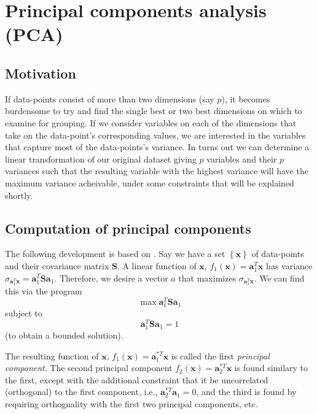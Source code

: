 \chapter{Principal components analysis (PCA)\label{chap:pca}}

\section{Motivation}

If data-points consist of more than two dimensions (say $p$), it becomes
burdensome to try and find the single best or two best dimensions on which to
examine for grouping. If we consider variables on each of the dimensions that
take on the data-point's corresponding values, we are interested in the
variables that capture most of the data-points's variance. In turns out we can
determine a linear transformation of our original dataset giving $p$ variables
and their $p$ variances such that the resulting variable with the highest
variance will have the maximum variance acheivable, under some constraints that
will be explained shortly. 

\section{Computation of principal components}

The following development is based on \cite{jolliffe2002principal}. Say we have
a set $\left\{ \boldsymbol{x} \right\}$ of data-points and their covariance
matrix $\boldsymbol{S}$. A linear function of $\boldsymbol{x}$,
$f_1(\boldsymbol{x})=\boldsymbol{a}_{1}^{T}\boldsymbol{x}$ has variance
$\sigma_{\boldsymbol{a}_{1}^{T}\boldsymbol{x}}=\boldsymbol{a}_{1}^{T}\boldsymbol{S}\boldsymbol{a}_{1}$.
Therefore, we desire a vector $a$ that maximizes
$\sigma_{\boldsymbol{a}_{1}^{T}\boldsymbol{x}}$. We can find this via the program
\[
        \max \boldsymbol{a}_{1}^{T}\boldsymbol{S}\boldsymbol{a}_{1}
\]
subject to
\[
    \boldsymbol{a}_{1}^{T}\boldsymbol{S}\boldsymbol{a}_{1}=1
\]
(to obtain a bounded solution).

The resulting function of $\boldsymbol{x}$,
$f_1(\boldsymbol{x})=\boldsymbol{a}_{1}^{\ast T}\boldsymbol{x}$ is called the first
\textit{principal component}. The second principal component
$f_2(\boldsymbol{x})=\boldsymbol{a}_{2}^{\ast T}\boldsymbol{x}$ is found similary
to the first, except with the additional constraint that it be uncorrelated
(orthogonal) to the first component, i.e.,
$\boldsymbol{a}_{2}^{\ast T}\boldsymbol{a}_{1}=0$, and the third is found by
requiring orthognality with the first two principal components, etc.

